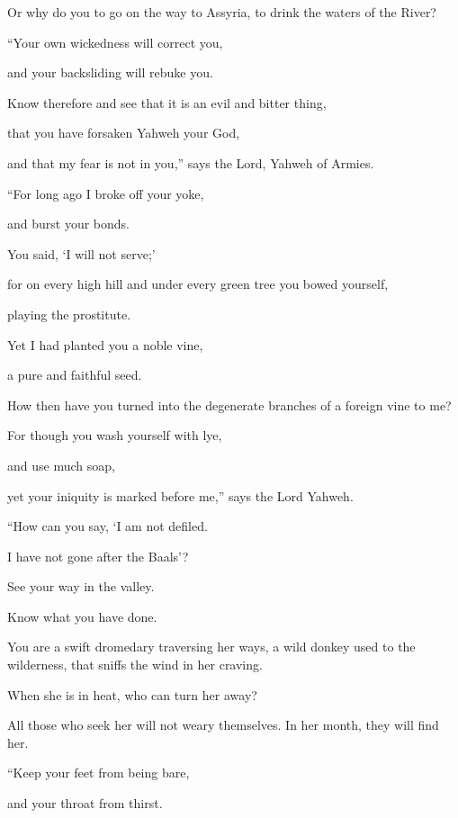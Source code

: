 {\par }{\QB Or why do you to go on the way to Assyria, to drink the waters of the River?
\par }{\Q {}“Your own wickedness will correct you,
\par }{\QB and your backsliding will rebuke you.
\par }{\Q Know therefore and see that it is an evil and bitter thing,
\par }{\QB that you have forsaken Yahweh your God,
\par }{\QB and that my fear is not in you,” says the Lord, Yahweh of Armies.
\par }{\Q {}“For long ago I broke off your yoke,
\par }{\QB and burst your bonds.
\par }{\Q You said, ‘I will not serve;’
\par }{\QB for on every high hill and under every green tree you bowed yourself,
\par }{\QB playing the prostitute.
\par }{\Q {}Yet I had planted you a noble vine,
\par }{\QB a pure and faithful seed.
\par }{\QB How then have you turned into the degenerate branches of a foreign vine to me?
\par }{\Q {}For though you wash yourself with lye,
\par }{\QB and use much soap,
\par }{\QB yet your iniquity is marked before me,” says the Lord Yahweh.
\par }{\Q {}“How can you say, ‘I am not defiled.
\par }{\QB I have not gone after the Baals’?
\par }{\Q See your way in the valley.
\par }{\QB Know what you have done.
\par }{\Q You are a swift dromedary traversing her ways,
a wild donkey used to the wilderness, that sniffs the wind in her craving.
\par }{\QB When she is in heat, who can turn her away?
\par }{\QB All those who seek her will not weary themselves. In her month, they will find her.
\par }{\Q {}“Keep your feet from being bare,
\par }{\QB and your throat from thirst.
}
